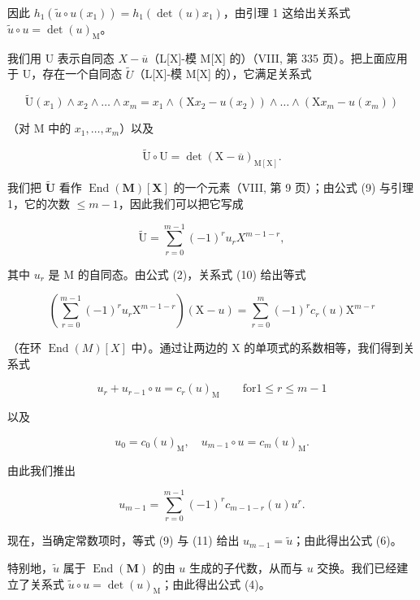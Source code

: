 因此 \(h_1(\widetilde{u} \circ u(x_1)) = h_1(\det(u)x_1)\)，由引理 1 这给出关系式 \(\widetilde{u} \circ u = \det(u)_\mathrm{M}\)。

我们用 U 表示自同态 \(X - \overline{u}\)（L{[}X{]}-模 M{[}X{]} 的）（VIII, 第 335 页）。把上面应用于 U，存在一个自同态 \(\widetilde{U}\)（L{[}X{]}-模 M{[}X{]} 的），它满足关系式

\[
\widetilde {\mathrm{U}} (x _ {1}) \wedge x _ {2} \wedge \dots \wedge x _ {m} = x _ {1} \wedge (\mathrm{X} x _ {2} - u (x _ {2})) \wedge \dots \wedge (\mathrm{X} x _ {m} - u (x _ {m}))\tag{9}
\]

（对 M 中的 \(x_{1},\ldots ,x_{m}\)）以及

\[
\widetilde {\mathrm{U}} \circ \mathrm{U} = \det (\mathrm{X} - \overline {{u}}) _ {\mathrm{M} [ \mathrm{X} ]}.\tag{10}
\]

我们把 \(\widetilde{\mathbf{U}}\) 看作 \(\operatorname{End}(\mathbf{M})[\mathbf{X}]\) 的一个元素（VIII, 第 9 页）；由公式 (9) 与引理 1，它的次数 \(\leqslant m - 1\)，因此我们可以把它写成

\[
\widetilde {\mathrm{U}} = \sum_ {r = 0} ^ {m - 1} (- 1) ^ {r} u _ {r} X ^ {m - 1 - r},\tag{11}
\]

其中 \(u_{r}\) 是 M 的自同态。由公式 (2)，关系式 (10) 给出等式

\[
\left(\sum_ {r = 0} ^ {m - 1} (- 1) ^ {r} u _ {r} \mathrm{X} ^ {m - 1 - r}\right) (\mathrm{X} - u) = \sum_ {r = 0} ^ {m} (- 1) ^ {r} c _ {r} (u) \mathrm{X} ^ {m - r}\tag{12}
\]

（在环 \(\operatorname{End}(M)[X]\) 中）。通过让两边的 X 的单项式的系数相等，我们得到关系式

\[
u _ {r} + u _ {r - 1} \circ u = c _ {r} (u) _ {\mathrm{M}} \qquad \mathrm{for} 1 \leqslant r \leqslant m - 1\tag{13}
\]

以及

\[
u _ {0} = c _ {0} (u) _ {\mathrm{M}}, \quad u _ {m - 1} \circ u = c _ {m} (u) _ {\mathrm{M}}.\tag{14}
\]

由此我们推出

\[
u _ {m - 1} = \sum_ {r = 0} ^ {m - 1} (- 1) ^ {r} c _ {m - 1 - r} (u) u ^ {r}.\tag{15}
\]

现在，当确定常数项时，等式 (9) 与 (11) 给出 \(u_{m-1} = \widetilde{u}\)；由此得出公式 (6)。

特别地，\(\widetilde{u}\) 属于 \(\operatorname{End}(\mathbf{M})\) 的由 \(u\) 生成的子代数，从而与 \(u\) 交换。我们已经建立了关系式 \(\widetilde{u} \circ u = \det(u)_{\mathrm{M}}\)；由此得出公式 (4)。

